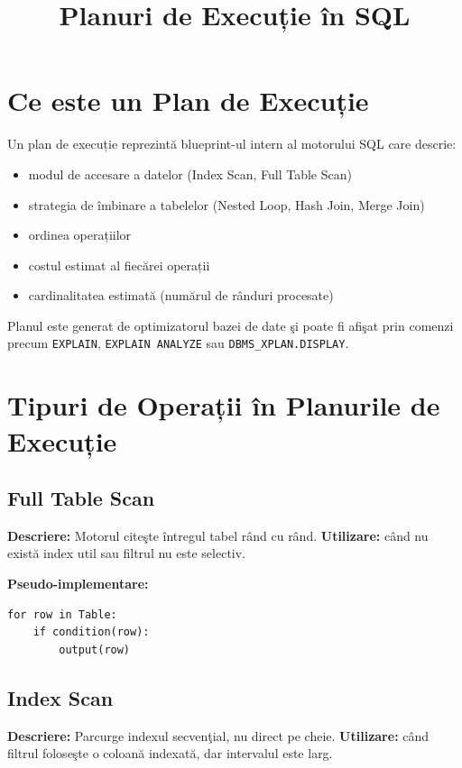 \documentclass[12pt]{article}
\title{Planuri de Execuție în SQL}
\author{}
\date{}
\begin{document}
\maketitle

\section{Ce este un Plan de Execuție}
Un plan de execuție reprezintă blueprint-ul intern al motorului SQL care descrie:
\begin{itemize}[noitemsep]
    \item modul de accesare a datelor (Index Scan, Full Table Scan)
    \item strategia de îmbinare a tabelelor (Nested Loop, Hash Join, Merge Join)
    \item ordinea operațiilor
    \item costul estimat al fiecărei operații
    \item cardinalitatea estimată (numărul de rânduri procesate)
\end{itemize}

Planul este generat de optimizatorul bazei de date şi poate fi afişat prin comenzi precum \texttt{EXPLAIN}, \texttt{EXPLAIN ANALYZE} sau \texttt{DBMS\_XPLAN.DISPLAY}.

\section{Tipuri de Operații în Planurile de Execuție}

\subsection{Full Table Scan}
\textbf{Descriere:} Motorul citeşte întregul tabel rând cu rând.  
\textbf{Utilizare:} când nu există index util sau filtrul nu este selectiv.

\textbf{Pseudo-implementare:}
\begin{verbatim}
for row in Table:
    if condition(row):
        output(row)
\end{verbatim}

\subsection{Index Scan}
\textbf{Descriere:} Parcurge indexul secvenţial, nu direct pe cheie.  
\textbf{Utilizare:} când filtrul foloseşte o coloană indexată, dar intervalul este larg.
\end{document}
